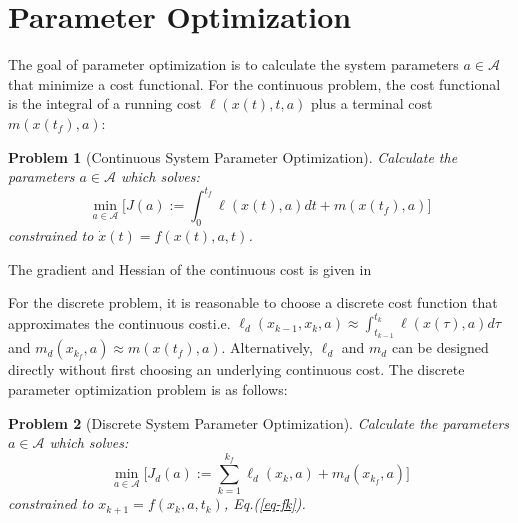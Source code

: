 \documentclass[letterpaper, 10pt, conference]{ieeeconf}
\newtheorem{problem}{Problem}
\begin{document}

\section{Parameter Optimization}
\label{sec-opt}
The goal of parameter optimization is to calculate the system parameters $a\in\mathcal{A}$ that minimize a cost functional.  For the continuous problem, the cost functional is the integral of a running cost $\ell(x(t),t,a)$ plus a terminal cost $m(x(t_f),a)$:
\begin{problem}[Continuous System Parameter Optimization]
Calculate the parameters $a\in\mathcal{A}$ which solves:
\[
\min_{a\in\mathcal{A}} \Big[J(a):=\int_0^{t_f}\ell(x(t),a)dt + m(x(t_f),a)\Big]
\]
constrained to $\dot{x}(t) = f(x(t),a,t)$.
\end{problem}
The gradient and Hessian of the continuous cost is given in \cite{miller_murphey}

For the discrete problem, it is reasonable to choose a discrete cost function that approximates the continuous cost\textemdash i.e. $\ell_d(x_{k-1},x_{k},a)\approx\int_{t_{k-1}}^{t_{k}}\ell(x(\tau),a)d\tau$ and $m_d(x_{k_f},a)\approx m(x(t_f),a)$.  Alternatively, $\ell_d$ and $m_d$ can be designed directly without first choosing an underlying continuous cost.  The discrete parameter optimization problem is as follows:
\begin{problem}[Discrete System Parameter Optimization]
Calculate the parameters $a\in\mathcal{A}$ which solves:
\[
\min_{a\in\mathcal{A}} \Big[J_d(a):=\sum_{k=1}^{k_f}\ell_d(x_k,a) + m_d(x_{k_f},a)\Big]
\]
constrained to $x_{k+1} = f(x_k,a,t_k)$, Eq.(\ref{eq-fk}).
\label{prob-disc}
\end{problem}
\end{document}
